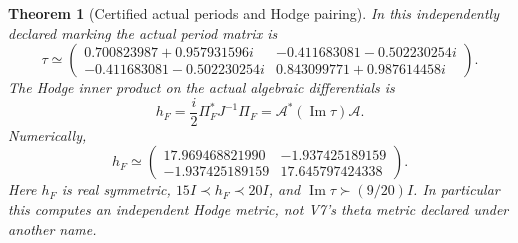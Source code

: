 \documentclass[11pt]{article}
\newtheorem{theorem}{Theorem}[section]
\theoremstyle{definition}
\theoremstyle{remark}
\begin{document}
\begin{theorem}[Certified actual periods and Hodge pairing]
\label{thm:v8-actual-periods}
In this independently declared marking the actual period matrix is
\begin{equation}
 \boxed{\tau\simeq
 \begin{pmatrix}
 0.700823987+0.957931596i&-0.411683081-0.502230254i\\
 -0.411683081-0.502230254i&0.843099771+0.987614458i
 \end{pmatrix}.}
 \label{eq:v8-tau-numeric}
\end{equation}
The Hodge inner product on the actual algebraic differentials is
\begin{equation}
 \boxed{h_F=\frac i2\Pi_F^*J^{-1}\Pi_F
 =\mathcal A^*(\operatorname{Im}\tau)\mathcal A.}
 \label{eq:v8-Hodge}
\end{equation}
Numerically,
\[h_F\simeq\begin{pmatrix}
 17.969468821990&-1.937425189159\\
 -1.937425189159&17.645797424338
 \end{pmatrix}.\]
Here $h_F$ is real symmetric, $15I\prec h_F\prec20I$, and
$\operatorname{Im}\tau\succ(9/20)I$. In particular this computes an
independent Hodge metric, not V7's theta metric declared under another name.
\end{theorem}
\end{document}
